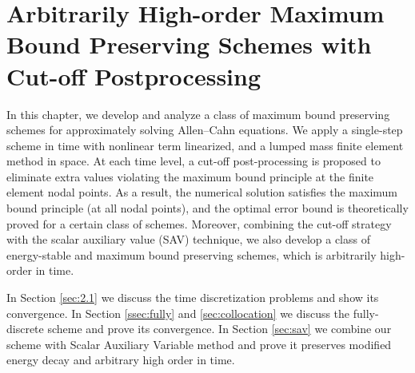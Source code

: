 \documentclass[a4paper, oneside]{book}
\begin{document}












\chapter{Arbitrarily High-order Maximum Bound Preserving Schemes with Cut-off Postprocessing}


In this chapter, we develop and analyze a class of maximum bound preserving schemes for approximately solving Allen--Cahn equations.
We apply a single-step scheme in time with nonlinear term linearized, and a lumped mass finite element method in space. At each time level, a cut-off post-processing
is proposed to eliminate extra values violating the maximum bound principle at the finite element nodal points.
As a result, the numerical solution satisfies the maximum bound principle (at all nodal points),
and the optimal error bound is theoretically proved for a certain class of schemes.
Moreover, combining the cut-off strategy with the scalar auxiliary value (SAV) technique,
we also develop a class of energy-stable and maximum bound preserving schemes, which is arbitrarily high-order in time.

In Section \ref{sec:2.1} we discuss the time discretization problems and show its convergence. 
In Section \ref{ssec:fully} and \ref{sec:collocation} 
we discuss the fully-discrete scheme and prove 
its convergence. In Section \ref{sec:sav} we combine our scheme with Scalar Auxiliary Variable method and 
prove it preserves modified energy decay and 
arbitrary high order in time. 
\end{document}
